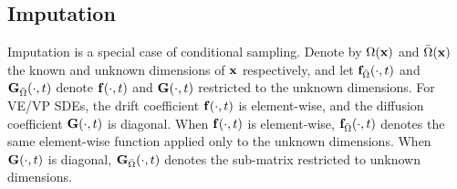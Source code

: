 \subsection{Imputation} \label{app:imputation}
Imputation is a special case of conditional sampling. Denote by $\Omega(\mathbf{x})$ and ${\bar{\Omega}}(\mathbf{x})$ the known and unknown dimensions of $\mathbf{x}$ respectively, and let $\mathbf{f}_{{\bar{\Omega}}}(\cdot, t)$ and $\mathbf{G}_{{\bar{\Omega}}}(\cdot, t)$ denote $\mathbf{f}(\cdot, t)$ and $\mathbf{G}(\cdot, t)$ restricted to the unknown dimensions. For VE/VP SDEs, the drift coefficient $\mathbf{f}(\cdot, t)$ is element-wise, and the diffusion coefficient $\mathbf{G}(\cdot, t)$ is diagonal. When $\mathbf{f}(\cdot, t)$ is element-wise, $\mathbf{f}_{{\bar{\Omega}}}(\cdot, t)$ denotes the same element-wise function applied only to the unknown dimensions. When $\mathbf{G}(\cdot, t)$ is diagonal, $\mathbf{G}_{{\bar{\Omega}}}(\cdot, t)$ denotes the sub-matrix restricted to unknown dimensions. 


